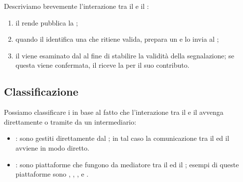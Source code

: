 Descriviamo brevemente l'interazione tra il \BI e il \BH \cite{hoffman2021bountychain}:
\begin{enumerate}


\item il \BI rende pubblica la \bugbounty;

\item quando il \BH identifica una \vulnerability che ritiene valida, prepara un \bugreport e lo invia al \BI;

\item il \bugreport viene esaminato dal \BI al fine di stabilire la validità della segnalazione; se questa viene confermata, il \BH riceve la \bountyreward per il suo contributo.

\end{enumerate}

\subsection{Classificazione}



Possiamo classificare i \BBP in base al fatto che l'interazione tra il \BI e il \BH avvenga direttamente o tramite da un intermediario:

\begin{itemize}

\item \InternalBBP: sono \BBP gestiti direttamente dal \BI \cite{hoffman2021bountychain}; in tal caso la comunicazione tra il \BI ed il \BH avviene in modo diretto.

\item \BugBountyPlatform: sono piattaforme che fungono da mediatore tra il \BI ed il \BH \cite{hoffman2021bountychain}; 
esempi di queste piattaforme sono \HackerOne, \Intigriti, \Bugcrowd, \Synack e \Yogosha \cite{walshe2023bountythesis3, walshe2020bountypaper}. 

\end{itemize}

